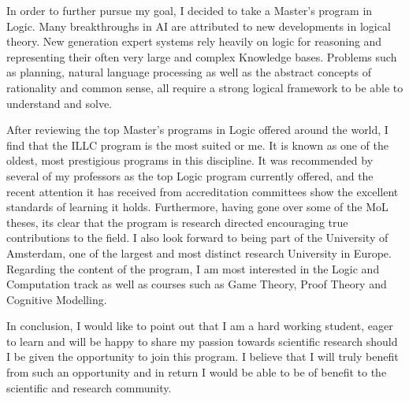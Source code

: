 \documentclass[10pt,stdletter,dateno,sigleft]{newlfm} %
\begin{document}
\begin{newlfm}
  In order to further pursue my goal, I decided to take a Master's program in
  Logic. Many breakthroughs in AI are attributed to new
  developments in logical theory. New generation expert systems rely heavily on
  logic for reasoning and representing their often very large and complex
  Knowledge bases. Problems such as planning, natural language processing as
  well as the abstract concepts of rationality and common sense, all require
  a strong logical framework to be able to understand and solve.

  After reviewing the top Master's programs in Logic offered around the world, 
  I find that the ILLC program is the most suited or me. It is known as one of
  the oldest, most prestigious programs in this discipline.  It was recommended by several of my
  professors as the top Logic program currently offered, and the recent
  attention it has received from accreditation committees show the excellent
  standards of learning it holds. Furthermore, having gone over some of the
  MoL theses, its clear that the program is research directed encouraging true
  contributions to the field. I also look forward to being part of the
  University of Amsterdam, one of the largest and most distinct research
  University in Europe. Regarding the content of the
  program, I am most interested in the Logic and Computation track as well as
  courses such as Game Theory, Proof Theory and Cognitive Modelling.

  In conclusion, I would like to point out that I am a hard working student,
  eager to learn and will be happy to share my passion towards scientific
  research should I be given the opportunity to join this program. I believe that I will truly benefit from
  such an opportunity and in return I would be able to be of benefit to the
  scientific and research community.

\end{newlfm}
\end{document}
